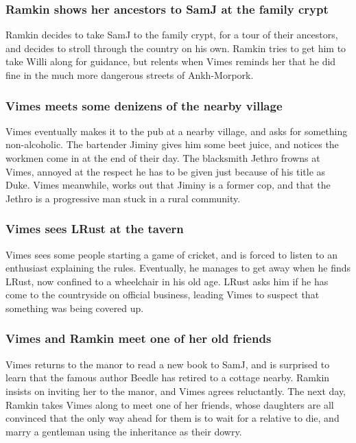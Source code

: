 \subsubsection{\Gls{Ramkin} shows her ancestors to \Gls{SamJ} at the family crypt}
\Gls{Ramkin} decides to take \Gls{SamJ} to the family crypt, for a tour of their ancestors, and
decides to stroll through the country on his own. \Gls{Ramkin} tries to get him to take \Gls{Willi}
along for guidance, but relents when \Gls{Vimes} reminds her that he did fine in the much more
dangerous streets of Ankh-Morpork.

\subsubsection{\Gls{Vimes} meets some denizens of the nearby village}
\Gls{Vimes} eventually makes it to the pub at a nearby village, and asks for something
non-alcoholic. The bartender \Gls{Jiminy} gives him some beet juice, and notices the workmen come
in at the end of their day. The blacksmith \Gls{Jethro} frowns at \Gls{Vimes}, annoyed at the
respect he has to be given just because of his title as Duke. \Gls{Vimes} meanwhile, works out that
\Gls{Jiminy} is a former cop, and that the \Gls{Jethro} is a progressive man stuck in a rural
community.

\subsubsection{\Gls{Vimes} sees \Gls{LRust} at the tavern}
\Gls{Vimes} sees some people starting a game of cricket, and is forced to listen to an enthusiast
explaining the rules. Eventually, he manages to get away when he finds \Gls{LRust}, now confined to
a wheelchair in his old age. \Gls{LRust} asks him if he has come to the countryside on official
business, leading \Gls{Vimes} to suspect that something was being covered up.

\subsubsection{\Gls{Vimes} and \Gls{Ramkin} meet one of her old friends}
\Gls{Vimes} returns to the manor to read a new book to \Gls{SamJ}, and is surprised to learn that
the famous author \Gls{Beedle} has retired to a cottage nearby. \Gls{Ramkin} insists on inviting her
to the manor, and \Gls{Vimes} agrees reluctantly. The next day, \Gls{Ramkin} takes \Gls{Vimes} along
to meet one of her friends, whose daughters are all convinced that the only way ahead for them is to
wait for a relative to die, and marry a gentleman using the inheritance as their dowry.

